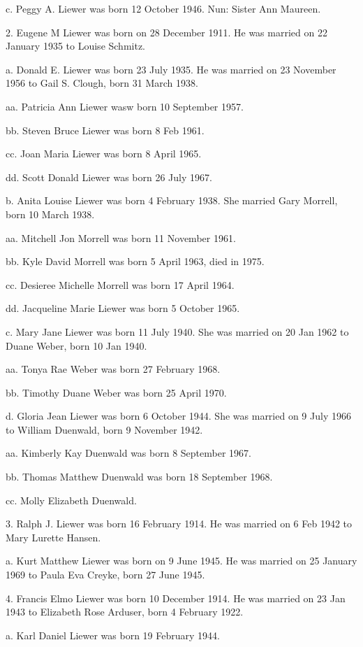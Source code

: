 \documentclass[a4paper]{article}
\begin{document}
c. Peggy A. Liewer was born 12 October 1946.  Nun: Sister Ann Maureen.

2. Eugene M Liewer was born on 28 December 1911.  He was married on 22 January 1935 to Louise Schmitz.

a. Donald E. Liewer was born 23 July 1935.  He was married on 23 November 1956 to Gail S. Clough, born 31 March 1938.

aa. Patricia Ann Liewer wasw born 10 September 1957.

bb. Steven Bruce Liewer was born 8 Feb 1961.

cc. Joan Maria Liewer was born 8 April 1965.

dd. Scott Donald Liewer was born 26 July 1967.

b. Anita Louise Liewer was born 4 February 1938.  She married Gary Morrell, born 10 March 1938.

aa. Mitchell Jon Morrell was born 11 November 1961.

bb. Kyle David Morrell was born 5 April 1963, died in 1975.

cc. Desieree Michelle Morrell was born 17 April 1964.

dd. Jacqueline Marie Liewer was born 5 October 1965.

c. Mary Jane Liewer was born 11 July 1940.  She was married on 20 Jan 1962 to Duane Weber, born 10 Jan 1940.

aa. Tonya Rae Weber was born 27 February 1968.

bb. Timothy Duane Weber was born 25 April 1970.

d. Gloria Jean Liewer was born 6 October 1944.  She was married on 9 July 1966 to William Duenwald, born 9 November 1942.

aa. Kimberly Kay Duenwald was born 8 September 1967.

bb. Thomas Matthew Duenwald was born 18 September 1968.

cc. Molly Elizabeth Duenwald.

3. Ralph J. Liewer was born 16 February 1914.  He was married on 6 Feb 1942 to Mary Lurette Hansen.

a. Kurt Matthew Liewer was born on 9 June 1945.  He was married on 25 January 1969 to Paula Eva Creyke, born 27 June 1945.

4. Francis Elmo Liewer was born 10 December 1914.  He was married on 23 Jan 1943 to Elizabeth Rose Arduser, born 4 February 1922.

a. Karl Daniel Liewer was born 19 February 1944.
\end{document}
